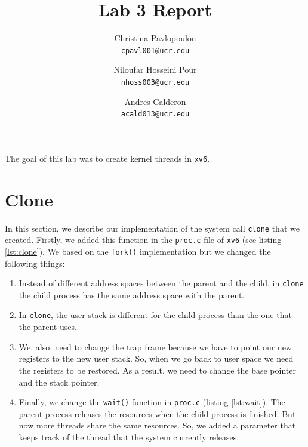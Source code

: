 \documentclass[10pt]{scrartcl}
\title{Lab 3 Report}
\author{
   Christina Pavlopoulou\\
  \small \texttt{cpavl001@ucr.edu}
  \and
   Niloufar Hosseini Pour\\
  \small \texttt{nhoss003@ucr.edu}
  \and
   Andres Calderon\\
  \small \texttt{acald013@ucr.edu}
}
\begin{document}
\maketitle

The goal of this lab was to create kernel threads in \texttt{xv6}. 

\section{Clone}
In this section, we describe our implementation of the system call \texttt{clone} that we created. Firstly, we added this function in the \texttt{proc.c} file of \texttt{xv6} (see listing \ref{lst:clone}). We based on the \texttt{fork()} implementation but we changed the following things:
\begin{enumerate}
\item Instead of different address spaces between the parent and the child, in \texttt{clone} the child process has the same address space with the parent. 
\item In \texttt{clone}, the user stack is different for the child process than the one that the parent uses. 
\item We, also, need to change the trap frame because we have to point our new registers to the new user stack. So, when we go back to user space we need the registers to be restored. As a result, we need to change the base pointer and the stack pointer. 
\item Finally, we change the \texttt{wait()} function in \texttt{proc.c} (listing \ref{lst:wait}). The parent process releases the resources when the child process is finished. But now more threads share the same resources. So, we added a parameter that keeps track of the thread that the system currently releases. 

\end{enumerate}


\end{document}
